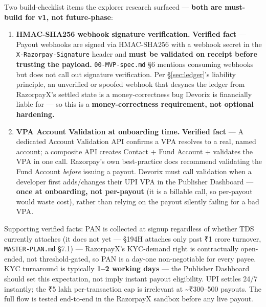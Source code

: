 \begin{tcolorbox}[colback=yellow!10,colframe=black!60,title=Must-build-v1 requirements (not future-phase),boxrule=0.8pt,arc=2pt]
Two build-checklist items the explorer research surfaced --- \textbf{both are must-build for v1, not future-phase}:

\begin{enumerate}
  \item \textbf{HMAC-SHA256 webhook signature verification.} \textbf{Verified fact} \citep{razorpaywebhooks_2026} --- Payout webhooks are signed via HMAC-SHA256 with a webhook secret in the \texttt{X-Razorpay-Signature} header and \textbf{must be validated on receipt before trusting the payload.} \texttt{00-MVP-spec.md} \S6 mentions consuming webhooks but does not call out signature verification. Per \S\ref{sec:ledger}'s liability principle, an unverified or spoofed webhook that desyncs the ledger from RazorpayX's settled state is a money-correctness bug Devorix is financially liable for --- so this is a \textbf{money-correctness requirement, not optional hardening.}
  \item \textbf{VPA Account Validation at onboarding time.} \textbf{Verified fact} \citep{razorpayvpa_2026} --- A dedicated Account Validation API confirms a VPA resolves to a real, named account; a composite API creates Contact + Fund Account + validates the VPA in one call. Razorpay's own best-practice docs recommend validating the Fund Account \textit{before} issuing a payout. Devorix must call validation when a developer first adds/changes their UPI VPA in the Publisher Dashboard --- \textbf{once at onboarding, not per-payout} (it is a billable call, so per-payout would waste cost), rather than relying on the payout silently failing for a bad VPA.
\end{enumerate}
\end{tcolorbox}

Supporting verified facts: PAN is collected at signup regardless of whether TDS currently attaches (it does not yet --- \S194H attaches only past ₹1 crore turnover, \texttt{MASTER-PLAN.md} \S7.1) \citep{razorpaykyc_2026} --- RazorpayX's KYC-demand right is contractually open-ended, not threshold-gated, so PAN is a day-one non-negotiable for every payee. KYC turnaround is typically \textbf{1--2 working days} \citep{creativenexus_2026} --- the Publisher Dashboard should set this expectation, not imply instant payout eligibility. UPI settles 24/7 instantly; the ₹5 lakh per-transaction cap is irrelevant at \textasciitilde{}₹300--500 payouts. The full flow is tested end-to-end in the RazorpayX sandbox before any live payout.

